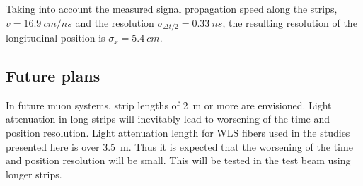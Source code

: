Taking into account the measured signal propagation speed along the strips, \mbox{$v=\SI{16.9}{cm/ns}$} and the resolution $\sigma_{\Delta t/2} = \SI{0.33}{ns}$, the resulting resolution of the longitudinal position is $\sigma_x = \SI{5.4}{cm}$.

\subsection{Future plans}

In future muon systems, strip lengths of \SI{2}{m} or more are envisioned. Light attenuation in long strips will inevitably lead to worsening of the time and position resolution. Light attenuation length for WLS fibers used in the studies presented here is over \SI{3.5}{m}. Thus it is expected that the worsening of the time and position resolution will be small. This will be tested in the test beam using longer strips.
